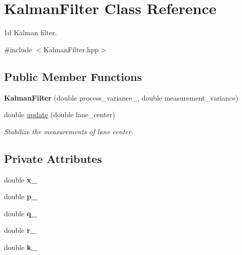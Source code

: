 \hypertarget{classKalmanFilter}{}\section{Kalman\+Filter Class Reference}
\label{classKalmanFilter}


1d Kalman filter.  




{\ttfamily \#include $<$Kalman\+Filter.\+hpp$>$}

\subsection*{Public Member Functions}
\begin{DoxyCompactItemize}
\item 
\mbox{\label{classKalmanFilter_a1896074df3e88eb15435cef16cb44244}} 
{\bfseries Kalman\+Filter} (double process\+\_\+variance\+\_\+, double measurement\+\_\+variance)
\item 
double \hyperlink{classKalmanFilter_ae57452f04b28846c9b68c5887eafa00e}{update} (double lane\+\_\+center)
\begin{DoxyCompactList}\small\item\em Stabilize the measurements of lane center. \end{DoxyCompactList}\end{DoxyCompactItemize}
\subsection*{Private Attributes}
\begin{DoxyCompactItemize}
\item 
\mbox{\label{classKalmanFilter_a5fb5caac98ba62747c94b986f7524c75}} 
double {\bfseries x\+\_\+}
\item 
\mbox{\label{classKalmanFilter_a4698f5f4b8ef83d799b1bcdaa87a980b}} 
double {\bfseries p\+\_\+}
\item 
\mbox{\label{classKalmanFilter_ae03f4ed668e9a6b89c72e661b17de6a5}} 
double {\bfseries q\+\_\+}
\item 
\mbox{\label{classKalmanFilter_a65fba3cea5655017378f967838a3b0c5}} 
double {\bfseries r\+\_\+}
\item 
\mbox{\label{classKalmanFilter_a1ef5d7bce9ef78523004e655ccf98a5e}} 
double {\bfseries k\+\_\+}
\end{DoxyCompactItemize}


